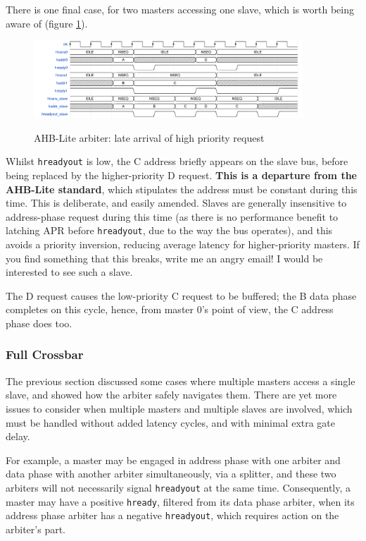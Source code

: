 There is one final case, for two masters accessing one slave, which is worth being aware of (figure \ref{diagram:ahbl_mm_latearrival}).

\begin{figure}[H]
\centering
\caption{AHB-Lite arbiter: late arrival of high priority request}
\includegraphics[width=0.9\textwidth]{waves/ahbl_mm_latearrival.pdf}
\label{diagram:ahbl_mm_latearrival}
\end{figure}

Whilst {\tt hreadyout} is low, the C address briefly appears on the slave bus, before being replaced by the higher-priority D request. \textbf{This is a departure from the AHB-Lite standard}, which stipulates the address must be constant during this time. This is deliberate, and easily amended. Slaves are generally insensitive to address-phase request during this time (as there is no performance benefit to latching APR before {\tt hreadyout}, due to the way the bus operates), and this avoids a priority inversion, reducing average latency for higher-priority masters. If you find something that this breaks, write me an angry email! I would be interested to see such a slave.

The D request causes the low-priority C request to be buffered; the B data phase completes on this cycle, hence, from master 0's point of view, the C address phase does too.

\subsubsection{Full Crossbar}

The previous section discussed some cases where multiple masters access a single slave, and showed how the arbiter safely navigates them. There are yet more issues to consider when multiple masters and multiple slaves are involved, which must be handled without added latency cycles, and with minimal extra gate delay.

For example, a master may be engaged in address phase with one arbiter and data phase with another arbiter simultaneously, via a splitter, and these two arbiters will not necessarily signal {\tt hreadyout} at the same time. Consequently, a master may have a positive {\tt hready}, filtered from its data phase arbiter, when its address phase arbiter has a negative {\tt hreadyout}, which requires action on the arbiter's part.

